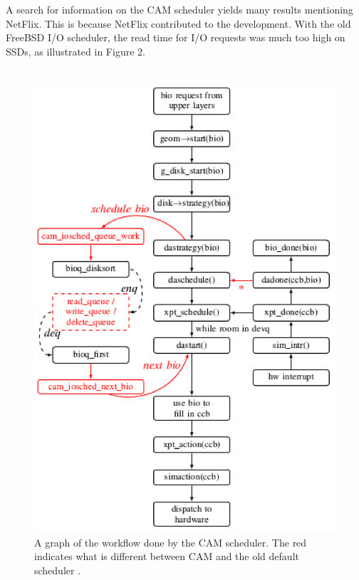 \documentclass[10pt,draftclsnofoot,onecolumn,journal,compsoc]{IEEEtran}
\begin{document}
A search for information on the CAM scheduler yields many results mentioning NetFlix. This is because NetFlix contributed to the development. With the old FreeBSD I/O scheduler, the read time for I/O requests was much too high on SSDs, as illustrated in Figure 2. \\ \\

\begin{figure}[H]
\centering
    \includegraphics[scale=1.0]{graph2.eps}
    \caption{A graph of the workflow done by the CAM scheduler. The red indicates what is different between CAM and the old default scheduler \cite{bsd2}.}
\end{figure}
\end{document}
